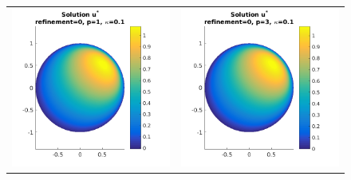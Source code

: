 \documentclass{article}
\begin{document}
\begin{figure}[!ht]
\centering
\begin{tabular}{c c}
\includegraphics[scale=0.7]{umustar_112.png} &
\includegraphics[scale=0.7]{umustar_212.png} \\

\end{tabular}
\end{figure}
\end{document}
